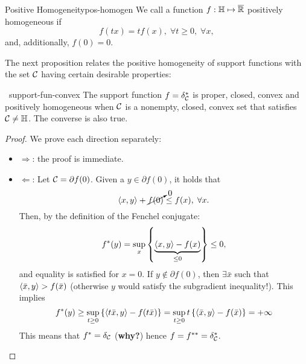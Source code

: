 \begin{cdefinition}{Positive Homogeneity}{pos-homogen}
    We call a function $f: \mathbb{H} \mapsto \overline{\mathbb{R}}$ positively homogeneous
    if
    \[
        f(tx) = tf(x), \; \forall t \geq 0, \; \forall x,
    \]
    and, additionally, $f(0) = 0$.
\end{cdefinition}
The next proposition relates the positive homogeneity of support functions with
the set $\mathcal{C}$ having certain desirable properties:
\begin{cproposition}{~}{support-fun-convex}
    The support function $f = \delta_{\mathcal{C}}^*$ is proper, closed, convex and
    positively homogeneous when $\mathcal{C}$ is a nonempty, closed, convex set that
    satisfies $\mathcal{C} \neq \mathbb{H}$. The converse is also true.
\end{cproposition}
\begin{proof}
    We prove each direction separately:
    \begin{itemize}
    \item $\Rightarrow$: the proof is immediate. 
    \item $\Leftarrow$: Let $\mathcal{C} = \partial f(0)$. Given a $y \in \partial
    f(0)$, it holds that
    \[
        \left\langle x, y \right\rangle + \cancelto{0}{f(0)} \leq f(x), \; \forall x.
    \]
    Then, by the definition of the Fenchel conjugate:
    \[
        f^*(y) = \sup_{x} \left\{ \underbrace{\left\langle x, y \right\rangle - f(x)}_{\leq 0} \right\}
        \leq 0,
    \]
    and equality is satisfied for $x = 0$. If $y \notin \partial f(0)$, then
    $\exists \bar{x}$ such that $\left\langle \bar{x}, y \right\rangle > f(\bar{x})$ (otherwise $y$
    would satisfy the subgradient inequality!). This implies
    \[
        f^*(y) \geq \sup_{t \geq 0} \left\{ \left\langle t\bar{x}, y \right\rangle - f(t \bar{x}) \right\}
        = \sup_{t \geq 0} t \left\{ \left\langle \bar{x}, y \right\rangle - f(\bar{x}) \right\} = +\infty
    \]
    This means that $f^* = \delta_{\mathcal{C}}$ (\textbf{why?}) hence $f = f^{**} =
    \delta_{\mathcal{C}}^*$.
    \end{itemize}
\end{proof}
